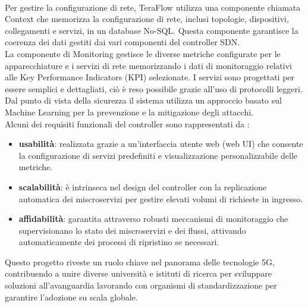 \\Per gestire la configurazione di rete, TeraFlow utilizza una componente chiamata Context che memorizza la configurazione di rete, inclusi topologie, dispositivi, 
collegamenti e servizi, in un database No-SQL\cite{D31}. Questa componente garantisce la coerenza dei dati gestiti dai vari componenti del controller SDN.
\\La componente di Monitoring gestisce le diverse metriche configurate per le apparecchiature e i servizi di rete memorizzando i dati di monitoraggio relativi alle Key Performance Indicators (KPI) selezionate.
I servizi sono progettati per essere semplici e dettagliati, ciò è reso possibile grazie all'uso di protocolli leggeri.
Dal punto di vista della sicurezza il sistema utilizza un approccio basato sul Machine Learning per la prevenzione e la mitigazione degli attacchi.
\\Alcuni dei requisiti funzionali del controller sono rappresentati da \cite{D22}:
\begin{itemize} 
    \item \textbf{usabilità}: realizzata grazie a un'interfaccia utente web (web UI) che consente la configurazione di servizi predefiniti e visualizzazione personalizzabile delle metriche.
    \item \textbf{scalabilità}: è intrinseca nel design del controller con la replicazione automatica dei miscroservizi per gestire elevati volumi di richieste in ingresso.
    \item \textbf{affidabilità}: garantita attraverso robusti meccanismi di monitoraggio che supervisionano lo stato dei miscroservizi e dei flussi, attivando automaticamente dei processi di ripristino se necessari.
\end{itemize}
Questo progetto riveste un ruolo chiave nel panorama delle tecnologie 5G, contribuendo a unire diverse università e istituti di ricerca per sviluppare soluzioni all'avanguardia
lavorando con organismi di standardizzazione per garantire l'adozione su scala globale.

